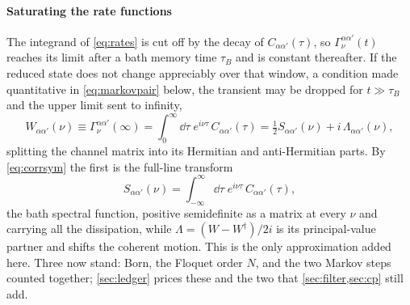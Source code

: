 \documentclass[a4paper,11pt]{article}
\begin{document}
\paragraph{Saturating the rate functions}
The integrand of \eqref{eq:rates} is cut off by the decay of $C_{\alpha\alpha'}(\tau)$, so $\Gamma^{\alpha\alpha'}_\nu(t)$ reaches its limit after a bath memory time $\tau_B$ and is constant thereafter. If the reduced state does not change appreciably over that window, a condition made quantitative in \eqref{eq:markovpair} below, the transient may be dropped for $t\gg\tau_B$ and the upper limit sent to infinity,
\begin{equation}\label{eq:halftransform}
  W_{\alpha\alpha'}(\nu) \equiv \Gamma^{\alpha\alpha'}_\nu(\infty)
  = \int_0^\infty\!\dd\tau\;e^{i\nu\tau}\,C_{\alpha\alpha'}(\tau)
  = \tfrac12 S_{\alpha\alpha'}(\nu) + i\,\Lambda_{\alpha\alpha'}(\nu),
\end{equation}
splitting the channel matrix into its Hermitian and anti-Hermitian parts. By \eqref{eq:corrsym} the first is the full-line transform
\begin{equation}\label{eq:spectralfn}
  S_{\alpha\alpha'}(\nu) = \int_{-\infty}^{\infty}\!\dd\tau\;e^{i\nu\tau}\,C_{\alpha\alpha'}(\tau),
\end{equation}
the bath spectral function, positive semidefinite as a matrix at every $\nu$ and carrying all the dissipation, while $\Lambda = (W - W^\dagger)/2i$ is its principal-value partner and shifts the coherent motion. This is the only approximation added here. Three now stand: Born, the Floquet order $N$, and the two Markov steps counted together; \cref{sec:ledger} prices these and the two that \cref{sec:filter,sec:cp} still add.
\end{document}
